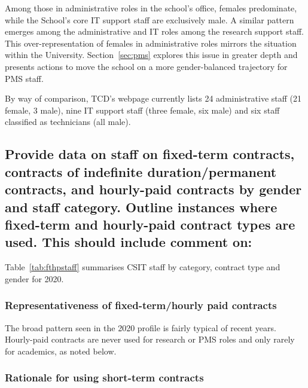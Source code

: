 Among those in administrative roles in the school's office, 
females predominate, while the School's core IT support staff 
are exclusively male. A similar pattern emerges among the 
administrative and IT roles among the research support staff.
This over-representation of females in administrative roles mirrors
the situation within the University.
Section~\ref{sec:pms} explores this issue in greater depth 
and presents actions to move the school on a more gender-balanced
trajectory for PMS staff.

By way of comparison, TCD's webpage currently lists 24 administrative 
staff (21 female, 3 male), nine IT support staff (three female, six
male) and six staff classified as technicians (all male).

\subsection{Provide data on staff on fixed-term contracts, contracts of indefinite duration/permanent contracts, and hourly-paid contracts by gender and staff category. Outline instances where fixed-term and hourly-paid contract types are used. This should include comment on:}

Table~\ref{tab:fthpstaff} summarises CSIT staff by category, contract 
type and gender for 2020.



\subsubsection{Representativeness of fixed-term/hourly paid contracts}

The broad pattern seen in the 2020 profile is fairly typical
of recent years. Hourly-paid contracts are never used for research 
or PMS roles and only rarely for academics, as noted below.


\subsubsection{Rationale for using short-term contracts}
\label{rationalecontracts}

